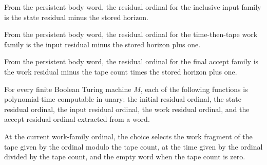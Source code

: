\begin{definition}
\label{Complexity.clA5InputIndex}
\leanok
{}
From the persistent body word, the residual ordinal for the inclusive input family is the state residual minus the stored horizon.
\end{definition}

\begin{definition}
\label{Complexity.clA5WorkIndex}
\leanok
{}
From the persistent body word, the residual ordinal for the time-then-tape work family is the input residual minus the stored horizon plus one.
\end{definition}

\begin{definition}
\label{Complexity.clA5AcceptIndex}
\leanok
{}
From the persistent body word, the residual ordinal for the final accept family is the work residual minus the tape count times the stored horizon plus one.
\end{definition}

\begin{lemma}
\label{Complexity.clA5Indices_native}
\leanok
{}
For every finite Boolean Turing machine $M$, each of the following functions is
polynomial-time computable in unary: the initial residual ordinal, the state residual
ordinal, the input residual ordinal, the work residual ordinal, and the accept residual
ordinal extracted from a word.
\end{lemma}

\begin{definition}
\label{Complexity.clA5WorkChoice}
\leanok
{}
At the current work-family ordinal, the choice selects the work fragment of the tape given by the ordinal modulo the tape count, at the time given by the ordinal divided by the tape count, and the empty word when the tape count is zero.
\end{definition}

